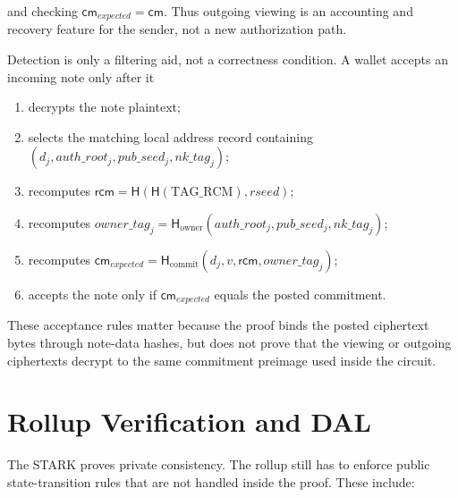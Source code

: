 \documentclass[11pt]{article}
\newcommand{\Hash}{\mathsf{H}}
\newcommand{\cm}{\mathsf{cm}}
\newcommand{\rcm}{\mathsf{rcm}}
\begin{document}
and checking \(\cm_{expected} = \cm\). Thus outgoing viewing is an accounting
and recovery feature for the sender, not a new authorization path.

Detection is only a filtering aid, not a correctness condition. A wallet accepts
an incoming note only after it

\begin{enumerate}
  \item decrypts the note plaintext;
  \item selects the matching local address record containing
        \((d_j, auth\_root_j, pub\_seed_j, nk\_tag_j)\);
  \item recomputes \(\rcm = \Hash(\Hash(\mathrm{TAG\_RCM}), rseed)\);
  \item recomputes
        \(owner\_tag_j = \Hash_{\mathrm{owner}}(auth\_root_j, pub\_seed_j, nk\_tag_j)\);
  \item recomputes
        \(\cm_{expected} = \Hash_{\mathrm{commit}}(d_j, v, \rcm, owner\_tag_j)\);
  \item accepts the note only if \(\cm_{expected}\) equals the posted
        commitment.
\end{enumerate}

These acceptance rules matter because the proof binds the posted ciphertext
bytes through note-data hashes, but does not prove that the viewing or outgoing
ciphertexts decrypt to the same commitment preimage used inside the circuit.

\section{Rollup Verification and DAL}

The STARK proves private consistency. The rollup still has to enforce public
state-transition rules that are not handled inside the proof. These include:
\end{document}
